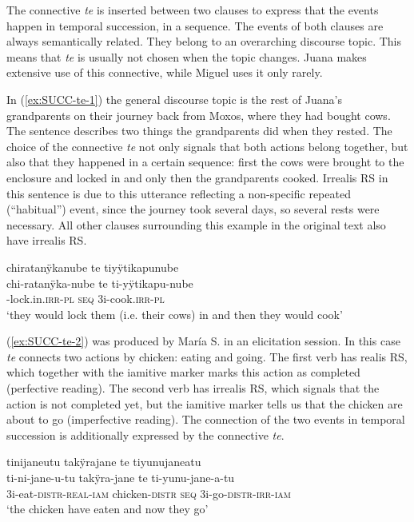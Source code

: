 The connective \textit{te} is inserted between two clauses to express that the events happen in temporal succession, in a sequence. The events of both clauses are always semantically related. They belong to an overarching discourse topic. This means that \textit{te} is usually not chosen when the topic changes. Juana makes extensive use of this connective, while Miguel uses it only rarely. 

In (\ref{ex:SUCC-te-1}) the general discourse topic is the rest of Juana’s grandparents on their journey back from Moxos, where they had bought cows. The sentence describes two things the grandparents did when they rested. The choice of the connective \textit{te} not only signals that both actions belong together, but also that they happened in a certain sequence: first the cows were brought to the enclosure and locked in and only then the grandparents cooked. Irrealis RS in this sentence is due to this utterance reflecting a non-specific repeated (“habitual”) event, since the journey took several days, so several rests were necessary. All other clauses surrounding this example in the original text also have irrealis RS. 

\ea\label{ex:SUCC-te-1}
\begingl
\glpreamble chiratanÿkanube te tiyÿtikapunube\\
\gla chi-ratanÿka-nube te ti-yÿtikapu-nube\\
-lock.in.\textsc{irr}-\textsc{pl} \textsc{seq} 3i-cook.\textsc{irr}-\textsc{pl}\\
\glft ‘they would lock them (i.e. their cows) in and then they would cook’
\endgl
\trailingcitation{[jxx-p151016l-2.058]}
\xe


(\ref{ex:SUCC-te-2}) was produced by María S. in an elicitation session. In this case \textit{te} connects two actions by chicken: eating and going. The first verb has realis RS, which together with the iamitive marker marks this action as completed (perfective reading). The second verb has irrealis RS, which signals that the action is not completed yet, but the iamitive marker tells us that the chicken are about to go (imperfective reading). The connection of the two events in temporal succession is additionally expressed by the connective \textit{te}. 

\ea\label{ex:SUCC-te-2}
\begingl
\glpreamble tinijaneutu takÿrajane te tiyunujaneatu\\
\gla ti-ni-jane-u-tu takÿra-jane te ti-yunu-jane-a-tu\\
\glb 3i-eat-\textsc{distr}-\textsc{real}-\textsc{iam} chicken-\textsc{distr} \textsc{seq} 3i-go-\textsc{distr}-\textsc{irr}-\textsc{iam}\\
\glft ‘the chicken have eaten and now they go’
\endgl
\trailingcitation{[rxx-e181022le]}
\xe

